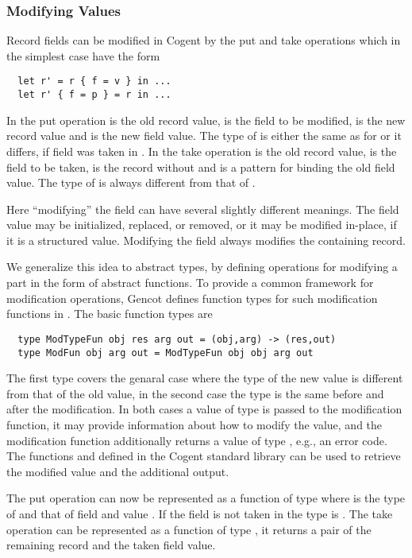 \subsubsection{Modifying Values}

Record fields can be modified in Cogent by the put and take operations which in the simplest case have the form
\begin{verbatim}
  let r' = r { f = v } in ...
  let r' { f = p } = r in ...
\end{verbatim}
In the put operation  is the old record value,  is the field to be modified,  is the 
new record value and  is the new field value. The type of  is either the same as for  or it
differs, if field  was taken in . In the take operation  is the old record value,  
is the field to be taken,  is the record without  and  is a pattern for binding the old 
field value. The type of  is always different from that of .

Here ``modifying'' the field can have several slightly different meanings. The field value may be initialized, replaced,
or removed, or it may be modified in-place, if it is a structured value. Modifying the field always modifies the 
containing record.

We generalize this idea to abstract types, by defining operations for modifying a part in the form of abstract functions.
To provide a common framework for modification operations, Gencot defines function types for such modification functions 
in . The basic function types are
\begin{verbatim}
  type ModTypeFun obj res arg out = (obj,arg) -> (res,out)
  type ModFun obj arg out = ModTypeFun obj obj arg out
\end{verbatim}
The first type covers the genaral case where the type of the new value is different from that of the old value, in the second
case the type is the same before and after the modification. In both cases a value of type  is passed to the modification
function, it may provide information about how to modify the value, and the modification function additionally returns a value of
type , e.g., an error code. The functions  and  defined in the Cogent standard library can be used
to retrieve the modified value and the additional output.

The put operation can now be represented as a function of type  where  is the type of
 and  that of field  and value . If the field is not taken in  the type is .
The take operation can be represented as a function of type , it returns 
a pair of the remaining record and the taken field value.


